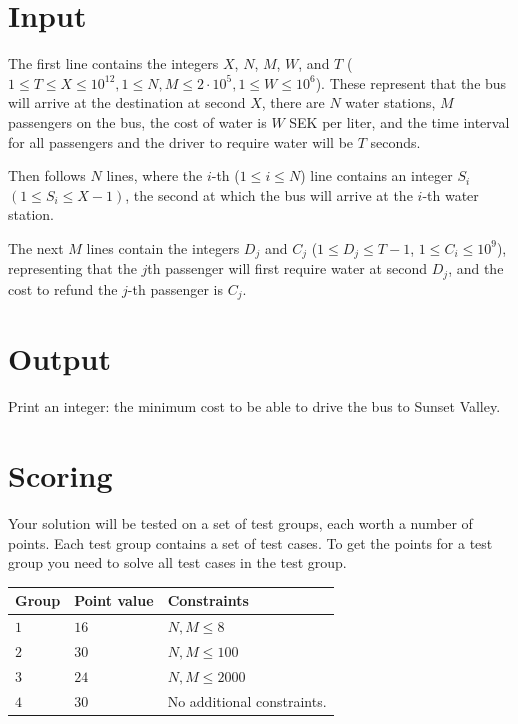 \section*{Input}
\noindent
The first line contains the integers $X$, $N$, $M$, $W$, and $T$ 
($1 \leq T \leq X \leq 10^{12}, 1 \leq N,M \leq 2\cdot 10^5, 1 \leq W \leq 10^6$). 
These represent that the bus will arrive at the destination at second $X$, there are $N$ water stations, 
$M$ passengers on the bus, the cost of water is $W$ SEK per liter, and the time interval 
for all passengers and the driver to require water will be $T$ seconds.

Then follows $N$ lines, where the $i$-th ($1 \leq i \leq N$) line contains an integer $S_i$ $(1 \leq S_i \leq X-1)$, 
the second at which the bus will arrive at the $i$-th water station.

The next $M$ lines contain the integers $D_j$ and $C_j$ ($1 \leq D_j \leq T-1$, $1 \leq C_i \leq 10^9$), 
representing that the $j$th passenger will first require water at second $D_j$, and the cost to refund the $j$-th passenger is $C_j$.

\section*{Output}
\noindent
Print an integer: the minimum cost to be able to drive the bus to Sunset Valley.

\section*{Scoring}
Your solution will be tested on a set of test groups, each worth a number of points. 
Each test group contains a set of test cases. 
To get the points for a test group you need to solve all test cases in the test group.

\noindent
\begin{tabular}{| l | l | p{12cm} |}
  \hline
  \textbf{Group} & \textbf{Point value} & \textbf{Constraints} \\ \hline
  $1$    & $16$         & $N,M \leq 8$  \\ \hline
  $2$    & $30$         & $N,M \leq 100$ \\ \hline
  $3$    & $24$         & $N,M \leq 2000$ \\ \hline
  $4$    & $30$         & No additional constraints. \\ \hline
\end{tabular}




